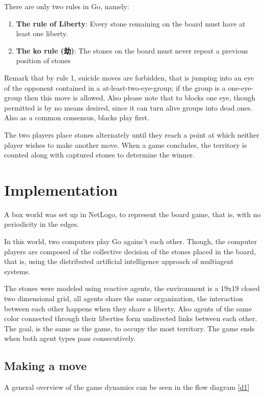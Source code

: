 \documentclass[a4paper,10pt,twocolumn]{article}
\begin{document}
\begin{CJK*}{UTF8}{gbsn}
There are only two rules in Go, namely: 

\begin{enumerate}
\item \textbf{The rule of Liberty}: Every stone remaining on the board must have at least one liberty.
\item \textbf{The ko rule (劫)}: The stones on the board must never repeat a previous position of stones
\end{enumerate}

Remark that by rule 1, suicide moves are forbidden, that is jumping into an eye of the opponent contained in a at-least-two-eye-group; if the group is a one-eye-group then this move is allowed. Also please note that to blocks one eye, though permitted is by no means desired, since it can turn alive groups into dead ones. Also as a common consensus, blacks play first.   

The two players place stones alternately until they reach a point at which neither player wishes to make another move. When a game concludes, the territory is counted along with captured stones to determine the winner. 

\section{Implementation}
A box world was set up in NetLogo, to represent the board game, that is, with no periodicity in the edges.  

In this world, two computers play Go agains't each other. Though, the computer players are composed of the collective decision of the stones placed in the board, that is, using the distributed artificial intelligence approach of multiagent systems. 

The stones were modeled using reactive agents, the environment is a 19x19 closed two dimensional grid, all agents share the same organization, the interaction between each other happens when they share a liberty. Also agents of the same color connected through their liberties form undirected links between each other.  The goal, is the same as the game, to occupy the most territory.  The game ends when both agent types pass consecutively. 

\subsection{Making a move}
A general overview of the game dynamics can be seen in the flow diagram \ref{d1}


\end{CJK*}
\end{document}
